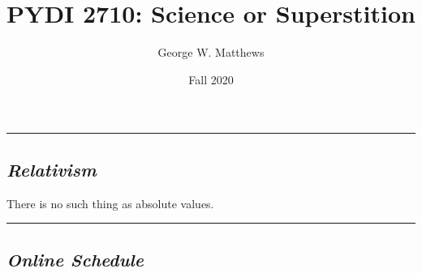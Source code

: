\documentclass[
]{article}
\title{PYDI 2710: Science or Superstition}
\author{George W. Matthews}
\date{Fall 2020}
\begin{document}
\maketitle

\thispagestyle{fancy}

\begin{center}\rule{0.5\linewidth}{0.5pt}\end{center}

\hypertarget{relativism}{%
\subsection{\texorpdfstring{\emph{Relativism}}{Relativism}}\label{relativism}}

\begin{card-row}

\begin{small-card}

There is no such thing as absolute values.

\end{small-card}

\end{card-row}

\begin{center}\rule{0.5\linewidth}{0.5pt}\end{center}

\hypertarget{online-schedule}{%
\subsection{\texorpdfstring{\emph{Online
Schedule}}{Online Schedule}}\label{online-schedule}}
\end{document}
